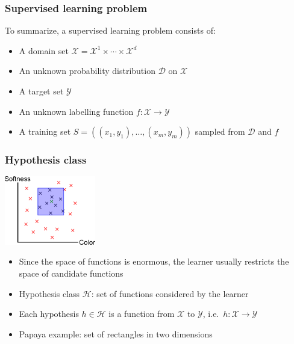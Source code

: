 \documentclass[10pt]{beamer}
\begin{document}
\begin{frame}
  \frametitle{Supervised learning problem}
  To summarize, a supervised learning problem consists of:
  \begin{itemize}
	\item A domain set $\mathcal{X}=\mathcal{X}^1\times\cdots\times\mathcal{X}^d$
	\item An {\color{red} unknown} probability distribution $\mathcal{D}$ on $\mathcal{X}$
	\item A target set $\mathcal{Y}$
	\item An {\color{red} unknown} labelling function $f:\mathcal{X}\rightarrow\mathcal{Y}$
	\item A training set $S=((x_1,y_1),\ldots,(x_m,y_m))$ {\color{blue} sampled} from $\mathcal{D}$ and $f$
  \end{itemize}
\end{frame}

\begin{frame}
  \frametitle{Hypothesis class}
  \begin{center}
	\includegraphics[height=3cm]{images/papaya3.png}
  \end{center}
  \begin{itemize}
	\item Since the space of functions is enormous, the learner usually {\color{red} restricts} the space of candidate functions
	\item Hypothesis class $\mathcal{H}$: set of functions considered by the learner
	\item Each hypothesis $h\in\mathcal{H}$ is a function from $\mathcal{X}$ to $\mathcal{Y}$, i.e.~$h:\mathcal{X}\rightarrow\mathcal{Y}$
	\item Papaya example: set of rectangles in two dimensions
  \end{itemize}
\end{frame}
\end{document}
